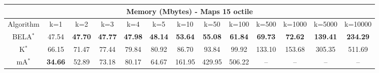 \begin{tabular}{c|cccccccccccc}\toprule
\multicolumn{13}{c}{Memory (Mbytes) - Maps 15 octile}\\ \midrule
Algorithm & k=1 & k=2 & k=3 & k=4 & k=5 & k=10 & k=50 & k=100 & k=500 & k=1000 & k=5000 & k=10000 \\ \midrule
BELA$^*$ & 47.54 & \textbf{47.70} & \textbf{47.77} & \textbf{47.98} & \textbf{48.14} & \textbf{53.64} & \textbf{55.08} & \textbf{61.84} & \textbf{69.73} & \textbf{72.62} & \textbf{139.41} & \textbf{234.29} \\
K$^*$ & 66.15 & 71.47 & 77.44 & 79.84 & 80.92 & 86.70 & 93.84 & 99.92 & 133.10 & 153.68 & 305.35 & 511.69 \\
mA$^*$ & \textbf{34.66} & 52.89 & 73.18 & 80.17 & 64.67 & 161.95 & 429.95 & 506.22 & -- & -- & -- & -- \\ \bottomrule 
\end{tabular}
